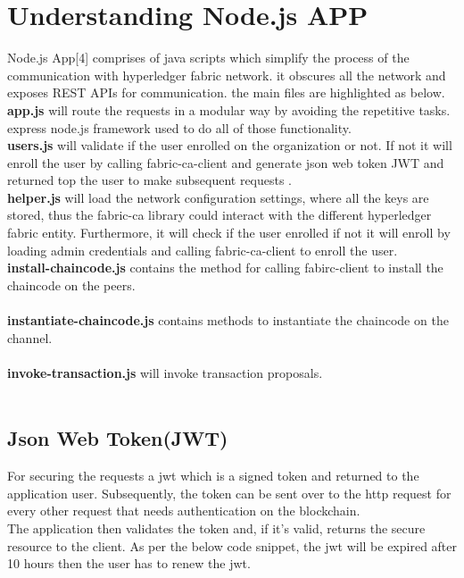 \section{Understanding Node.js APP} 
Node.js App[4] comprises of java scripts which simplify the process of the communication with hyperledger fabric network. it obscures all the network and exposes REST APIs for communication. the main files are highlighted as below. 
\ \\ 
\textbf{app.js} will route the requests in a modular way by avoiding the repetitive tasks. express node.js framework used to do all of those functionality. 
\ \\ 
\textbf{users.js} will validate if the user enrolled on the organization or not. If not it will enroll the user by calling fabric-ca-client and generate json web token JWT and returned top the user to make subsequent requests . 
\ \\ 
\textbf{helper.js} will load the network configuration settings, where all the keys are stored, thus the fabric-ca library could interact with the different hyperledger fabric entity. Furthermore, it will check if the user enrolled if not it will enroll by loading admin credentials and calling fabric-ca-client to enroll the user.
\ \\ 
\textbf{install-chaincode.js} contains the method for calling fabirc-client to install the chaincode on the peers.  \\ 
\ \\ 
\textbf{instantiate-chaincode.js} contains methods to instantiate the chaincode on the channel.  \\ 
\ \\  
\textbf{invoke-transaction.js} will invoke transaction proposals. \\
\ \\

\subsection{ Json Web Token(JWT) }
For securing the requests a jwt which is a signed token and returned to the application user.
Subsequently, the token can be sent over to the http request for every other request that needs authentication on the blockchain. \\ 
The application then validates the token and, if it’s valid, returns the secure resource to the client.
As per the below code snippet, the jwt will be expired after 10 hours then the user has to renew the jwt. \\ 

